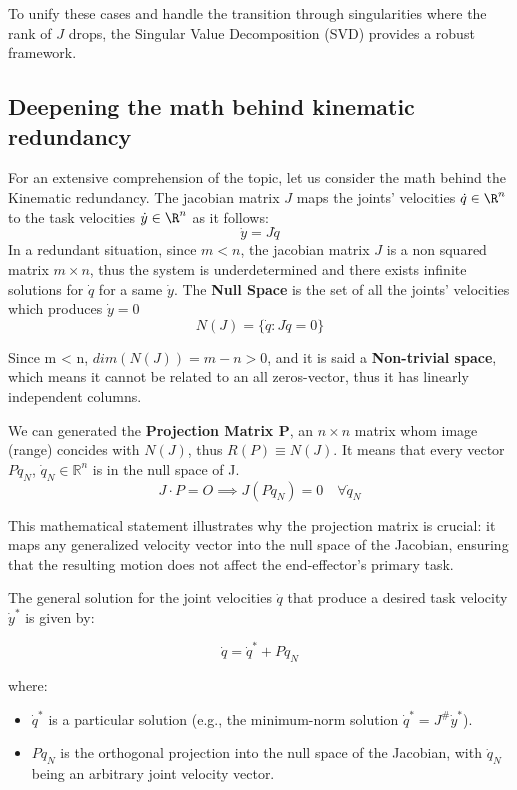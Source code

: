 To unify these cases and handle the transition through singularities where the rank of $J$ drops, 
the Singular Value Decomposition (SVD) provides a robust framework.

\subsection{Deepening the math behind kinematic redundancy}

For an extensive comprehension of the topic, let us consider the math behind the Kinematic redundancy.
The jacobian matrix $J$ maps the joints' velocities $\dot{q} \in \R^n$ to the task velocities $\dot{y}\in \R^n$ as it follows:
$$
\dot{y}=J\dot{q}
$$
In a redundant situation, since $ m < n $, the jacobian matrix $J$ is a non squared matrix $m \times n$, thus the system is underdetermined and there exists infinite solutions
for $\dot{q}$ for a same $\dot{y}$. The \textbf{Null Space} is the set of all the joints' velocities which produces $\dot{y} = 0$
$$
N(J) = \{\dot{q} : J\dot{q}=0\}
$$

Since m < n, $dim(N(J)) = m-n>0$, and it is said a \textbf{Non-trivial space}, which means it cannot be related to an all zeros-vector, thus it has linearly independent columns.

We can generated the \textbf{Projection Matrix P}, an $n \times n$ matrix whom image (range) concides with $N(J)$, thus ${R}(P) \equiv N(J)$. 
It means that every vector $P\dot{q}_N$, $\dot{q}_N \in \mathbb{R}^n$ is in the null space of J.
$$
J \cdot P = O \implies J(P\dot{q}_N) = 0 \quad \forall \dot{q}_N$$

This mathematical statement illustrates why the projection matrix is crucial:
it maps any generalized velocity vector into the null space of the Jacobian, ensuring that the resulting 
motion does not affect the end-effector's primary task.

The general solution for the joint velocities $\dot{q}$ that produce a desired task velocity $\dot{y}^*$ is given by:

\begin{equation}
    \dot{q} = \dot{q}^* + P \dot{q}_N
\end{equation}

where:
\begin{itemize}
    \item $\dot{q}^*$ is a particular solution (e.g., the minimum-norm solution $\dot{q}^* = J^{\#} \dot{y}^*$).
    \item $P \dot{q}_N$ is the orthogonal projection into the null space of the Jacobian, with $\dot{q}_N$ being an arbitrary joint velocity vector.
\end{itemize}

